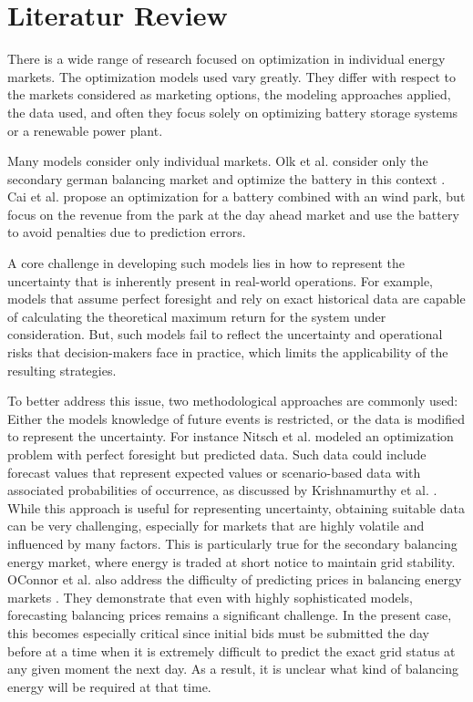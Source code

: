 \chapter{Literatur Review}

There is a wide range of research focused on optimization in individual energy markets.
The optimization models used vary greatly.
They differ with respect to the markets considered as marketing options,
the modeling approaches applied, the data used, and often they focus solely on optimizing
battery storage systems or a renewable power plant.

Many models consider only individual markets.  Olk et al. \cite{Olk.2019} consider only the secondary german balancing market and
optimize the battery in this context . Cai et al. \cite{Cai.2016} propose an optimization for a battery combined with an wind park, but
focus on the revenue from the park at the day ahead market and use the battery to avoid penalties due to prediction errors.

A core challenge in developing such models lies in how to represent the uncertainty
that is inherently present in real-world operations. For example, models that assume perfect
foresight and rely on exact historical data
are capable of calculating the theoretical maximum return for the system under consideration.
But, such models fail to reflect the uncertainty and operational risks
that decision-makers face in practice, which limits the applicability of the resulting strategies.

To better address this issue, two methodological approaches are commonly used:
Either the model\textquotesingle s knowledge of future events is restricted,
or the data is modified to represent the uncertainty.
For instance Nitsch et al. \cite{Nitsch.2021} modeled an optimization problem with perfect foresight but predicted data.
Such data could include forecast values that represent expected values or scenario-based data with associated
probabilities of occurrence, as discussed by Krishnamurthy et al. \cite{Krishnamurthy.2018}.
While this approach is useful for representing uncertainty, obtaining suitable data can be very
challenging, especially for markets that are highly volatile and influenced by many factors.
This is particularly true for the secondary balancing energy market, where energy is traded at short notice to maintain grid stability.
OConnor et al. \cite{OConnor.2024} also address the difficulty of predicting prices in balancing energy markets .
They demonstrate that even with highly sophisticated models, forecasting balancing prices remains a significant challenge.
In the present case, this becomes especially critical since initial bids must be submitted the day before at a time when it is
extremely difficult to predict the exact grid status at any given moment the next day.
As a result, it is unclear what kind of balancing energy will be required at that time.

